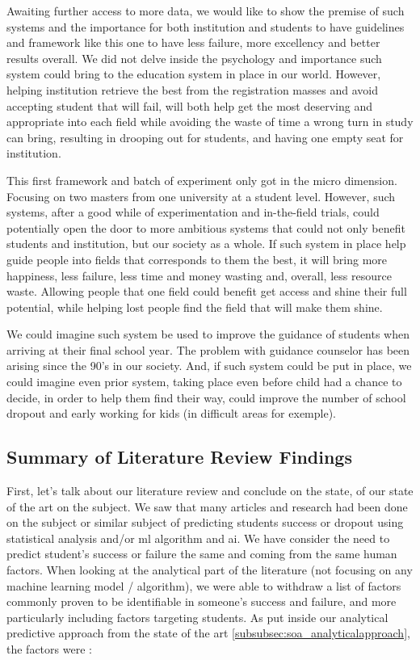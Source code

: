 \documentclass[../main.tex]{subfiles}
\begin{document}
Awaiting further access to more data, we would like to show the premise of such systems and the importance for both institution and students to have guidelines and framework like this one to have less failure, more excellency and better results overall.
We did not delve inside the psychology and importance such system could bring to the education system in place in our world. However, helping institution retrieve the best from the registration masses and avoid accepting student that will fail, will both help get the most deserving and appropriate into each field while avoiding the waste of time a wrong turn in study can bring, resulting in drooping out for students, and having one empty seat for institution.

This first framework and batch of experiment only got in the micro dimension. Focusing on two masters from one university at a student level. 
However, such systems, after a good while of experimentation and in-the-field trials, could potentially open the door to more ambitious systems that could not only benefit students and institution, but our society as a whole.
If such system in place help guide people into fields that corresponds to them the best, it will bring more happiness, less failure, less time and money wasting and, overall, less resource waste. Allowing people that one field could benefit get access and shine their full potential, while helping lost people find the field that will make them shine.

We could imagine such system be used to improve the guidance of students when arriving at their final school year. The problem with guidance counselor has been arising since the 90's in our society. And, if such system could be put in place, we could imagine even prior system, taking place even before child had a chance to decide, in order to help them find their way, could improve the number of school dropout and early working for kids (in difficult areas for exemple).

\subsection{Summary of Literature Review Findings}
First, let's talk about our literature review and conclude on the state, of our state of the art on the subject.
We saw that many articles and research had been done on the subject or similar subject of predicting students success or dropout using statistical analysis and/or \acrfull{ml} algorithm and \acrfull{ai}.
We have consider the need to predict student's success or failure the same and coming from the same human factors. When looking at the analytical part of the literature (not focusing on any machine learning model / algorithm), we were able to withdraw a list of factors commonly proven to be identifiable in someone's success and failure, and more particularly including factors targeting students. As put inside our analytical predictive approach from the state of the art \ref{subsubsec:soa_analyticalapproach}, the factors were : 
\end{document}
